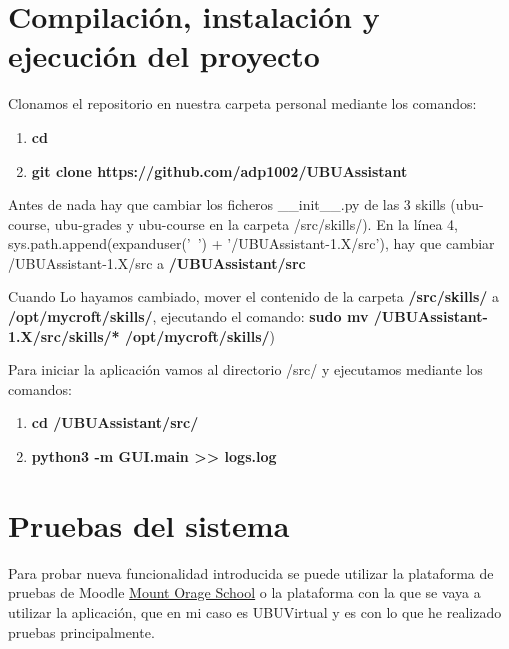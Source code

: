 \section{Compilación, instalación y ejecución del proyecto}

Clonamos el repositorio en nuestra carpeta personal mediante los comandos:
\begin{enumerate}
	\item \textbf{cd \detokenize{~}}
	\item \textbf{git clone https://github.com/adp1002/UBUAssistant}
\end{enumerate}

Antes de nada hay que cambiar los ficheros \_\_init\_\_.py de las 3 skills (ubu-course, ubu-grades y ubu-course en la carpeta /src/skills/). En la línea 4, sys.path.append(expanduser('~') + '/UBUAssistant-1.X/src'), hay que cambiar /UBUAssistant-1.X/src a \textbf{/UBUAssistant/src}

Cuando Lo hayamos cambiado, mover el contenido de la carpeta \textbf{\detokenize{~}/src/skills/} a \textbf{/opt/mycroft/skills/}, ejecutando el comando:
\textbf{sudo mv \detokenize{~}/UBUAssistant-1.X/src/skills/* /opt/mycroft/skills/})

Para iniciar la aplicación vamos al directorio /src/ y ejecutamos mediante los comandos:
\begin{enumerate}
	\item \textbf{cd \detokenize{~}/UBUAssistant/src/}
	\item \textbf{python3 -m GUI.main >\null> logs.log}
\end{enumerate}

\section{Pruebas del sistema}

Para probar nueva funcionalidad introducida se puede utilizar la plataforma de pruebas de Moodle \href{https://school.moodledemo.net/}{Mount Orage School} o la plataforma con la que se vaya a utilizar la aplicación, que en mi caso es UBUVirtual y es con lo que he realizado pruebas principalmente.